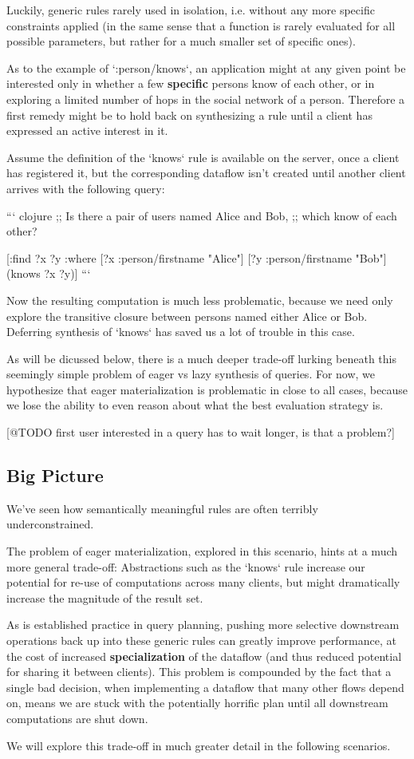 \documentclass[../catalog.tex]{subfiles}
\begin{document}
Luckily, generic rules rarely used in isolation, i.e. without any more
specific constraints applied (in the same sense that a function is
rarely evaluated for all possible parameters, but rather for a much
smaller set of specific ones).

As to the example of `:person/knows`, an application might at any
given point be interested only in whether a few \textbf{specific} persons
know of each other, or in exploring a limited number of hops in the
social network of a person. Therefore a first remedy might be to hold
back on synthesizing a rule until a client has expressed an active
interest in it.

Assume the definition of the `knows` rule is available on the server,
once a client has registered it, but the corresponding dataflow isn't
created until another client arrives with the following query:

``` clojure
;; Is there a pair of users named Alice and Bob, 
;; which know of each other?

[:find ?x ?y
 :where
 [?x :person/firstname "Alice"]
 [?y :person/firstname "Bob"]
 (knows ?x ?y)]
```

Now the resulting computation is much less problematic, because we
need only explore the transitive closure between persons named either
Alice or Bob. Deferring synthesis of `knows` has saved us a lot of
trouble in this case.

As will be dicussed below, there is a much deeper trade-off lurking
beneath this seemingly simple problem of eager vs lazy synthesis of
queries. For now, we hypothesize that eager materialization is
problematic in close to all cases, because we lose the ability to even
reason about what the best evaluation strategy is.

[@TODO first user interested in a query has to wait longer, is that a
problem?]

\subsection{Big Picture}

We've seen how semantically meaningful rules are often terribly
underconstrained.

The problem of eager materialization, explored in this scenario, hints
at a much more general trade-off: Abstractions such as the `knows`
rule increase our potential for re-use of computations across many
clients, but might dramatically increase the magnitude of the result
set.

As is established practice in query planning, pushing more selective
downstream operations back up into these generic rules can greatly
improve performance, at the cost of increased \textbf{specialization} of the
dataflow (and thus reduced potential for sharing it between
clients). This problem is compounded by the fact that a single bad
decision, when implementing a dataflow that many other flows depend
on, means we are stuck with the potentially horrific plan until all
downstream computations are shut down.

We will explore this trade-off in much greater detail in the following
scenarios.
\end{document}

